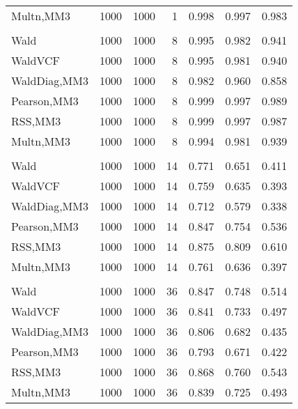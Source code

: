 \documentclass[
]{article}
\begin{document}
\begin{table}[H]
{\begin{tabular}[t]{lrrrrrr}
\hspace{1em}Multn,MM3 & 1000 & 1000 & 1 & 0.998 & 0.997 & 0.983\\
\addlinespace[0.3em]
\multicolumn{7}{l}{\textbf{1F 15V}}\\
\hspace{1em}Wald & 1000 & 1000 & 8 & 0.995 & 0.982 & 0.941\\
\hspace{1em}WaldVCF & 1000 & 1000 & 8 & 0.995 & 0.981 & 0.940\\
\hspace{1em}WaldDiag,MM3 & 1000 & 1000 & 8 & 0.982 & 0.960 & 0.858\\
\hspace{1em}Pearson,MM3 & 1000 & 1000 & 8 & 0.999 & 0.997 & 0.989\\
\hspace{1em}RSS,MM3 & 1000 & 1000 & 8 & 0.999 & 0.997 & 0.987\\
\hspace{1em}Multn,MM3 & 1000 & 1000 & 8 & 0.994 & 0.981 & 0.939\\
\addlinespace[0.3em]
\multicolumn{7}{l}{\textbf{2F 10V}}\\
\hspace{1em}Wald & 1000 & 1000 & 14 & 0.771 & 0.651 & 0.411\\
\hspace{1em}WaldVCF & 1000 & 1000 & 14 & 0.759 & 0.635 & 0.393\\
\hspace{1em}WaldDiag,MM3 & 1000 & 1000 & 14 & 0.712 & 0.579 & 0.338\\
\hspace{1em}Pearson,MM3 & 1000 & 1000 & 14 & 0.847 & 0.754 & 0.536\\
\hspace{1em}RSS,MM3 & 1000 & 1000 & 14 & 0.875 & 0.809 & 0.610\\
\hspace{1em}Multn,MM3 & 1000 & 1000 & 14 & 0.761 & 0.636 & 0.397\\
\addlinespace[0.3em]
\multicolumn{7}{l}{\textbf{3F 15V}}\\
\hspace{1em}Wald & 1000 & 1000 & 36 & 0.847 & 0.748 & 0.514\\
\hspace{1em}WaldVCF & 1000 & 1000 & 36 & 0.841 & 0.733 & 0.497\\
\hspace{1em}WaldDiag,MM3 & 1000 & 1000 & 36 & 0.806 & 0.682 & 0.435\\
\hspace{1em}Pearson,MM3 & 1000 & 1000 & 36 & 0.793 & 0.671 & 0.422\\
\hspace{1em}RSS,MM3 & 1000 & 1000 & 36 & 0.868 & 0.760 & 0.543\\
\hspace{1em}Multn,MM3 & 1000 & 1000 & 36 & 0.839 & 0.725 & 0.493\\
\bottomrule
\end{tabular}}
\endgroup{}
\end{table}
\end{document}
